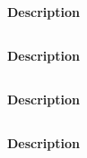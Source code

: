 \subsection{\formationD}
\paragraph{Description} \descriptifFD

\subsection{\formationE}
\paragraph{Description} \descriptifFE

\subsection{\formationFa}
\paragraph{Description} \descriptifFFa

\subsection{\formationFb}
\paragraph{Description} \descriptifFFb

\subsection{\formationG}
